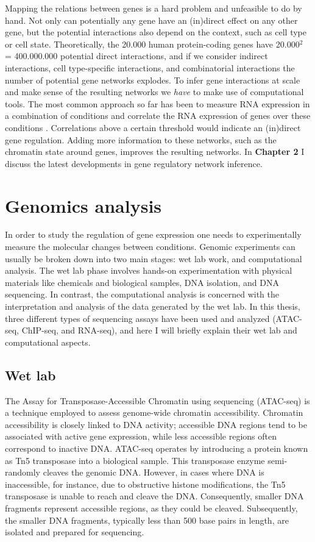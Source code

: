 Mapping the relations between genes is a hard problem and unfeasible to do by hand. Not only can potentially any gene have an (in)direct effect on any other gene, but the potential interactions also depend on the context, such as cell type or cell state. Theoretically, the 20.000 human protein-coding genes have 20.000$^2$ = 400.000.000 potential direct interactions, and if we consider indirect interactions, cell type-specific interactions, and combinatorial interactions the number of potential gene networks explodes. To infer gene interactions at scale and make sense of the resulting networks we \textit{have} to make use of computational tools. The most common approach so far has been to measure RNA expression in a combination of conditions and correlate the RNA expression of genes over these conditions \cite{Zhang_2005,Margolin_2006}. Correlations above a certain threshold would indicate an (in)direct gene regulation. Adding more information to these networks, such as the chromatin state around genes\cite{Xu_2020,Kamal_2021}, improves the resulting networks. In \textbf{Chapter 2} I discuss the latest developments in gene regulatory network inference.

\section{Genomics analysis}

In order to study the regulation of gene expression one needs to experimentally measure the molecular changes between conditions. Genomic experiments can usually be broken down into two main stages: wet lab work,  and computational analysis. The wet lab phase involves hands-on experimentation with physical materials like chemicals and biological samples, DNA isolation, and DNA sequencing. In contrast, the computational analysis is concerned with the interpretation and analysis of the data generated by the wet lab.  In this thesis, three different types of sequencing assays have been used and analyzed (ATAC-seq, ChIP-seq, and RNA-seq), and here I will briefly explain their wet lab and computational aspects. 

\subsection{Wet lab}

The Assay for Transposase-Accessible Chromatin using sequencing (ATAC-seq) is a technique employed to assess genome-wide chromatin accessibility\cite{Buenrostro_2015}. Chromatin accessibility is closely linked to DNA activity; accessible DNA regions tend to be associated with active gene expression, while less accessible regions often correspond to inactive DNA. ATAC-seq operates by introducing a protein known as Tn5 transposase into a biological sample. This transposase enzyme semi-randomly cleaves the genomic DNA. However, in cases where DNA is inaccessible, for instance, due to obstructive histone modifications, the Tn5 transposase is unable to reach and cleave the DNA. Consequently, smaller DNA fragments represent accessible regions, as they could be cleaved. Subsequently, the smaller DNA fragments, typically less than 500 base pairs in length, are isolated and prepared for sequencing.

